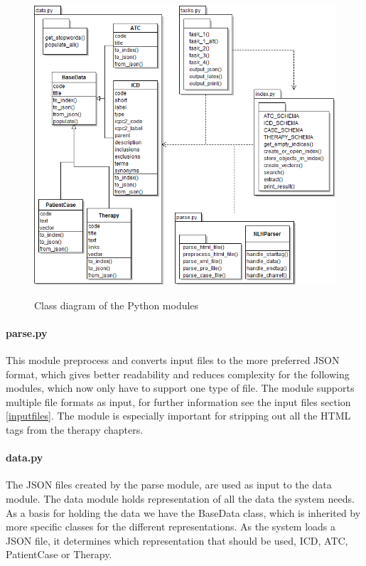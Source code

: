 \begin{figure}
	\centering
	\includegraphics[width=1.1\textwidth]{./img/class_diagram.png}\\
	\caption{Class diagram of the Python modules}
	\label{fig:class_diag}
\end{figure}

\paragraph{parse.py}
This module preprocess and converts input files to the more preferred JSON format, which gives better readability and reduces complexity for the following modules, which now only have to support one type of file. The module supports multiple file formats as input, for further information see the input files section \ref{inputfiles}. The module is especially important for stripping out all the HTML tags from the therapy chapters. 

\paragraph{data.py}
The JSON files created by the parse module, are used as input to the data module. The data module holds representation of all the data the system needs. As a basis for holding the data we have the BaseData class, which is inherited by more specific classes for the different representations. As the system loads a JSON file, it determines which representation that should be used, ICD, ATC, PatientCase or Therapy. 


